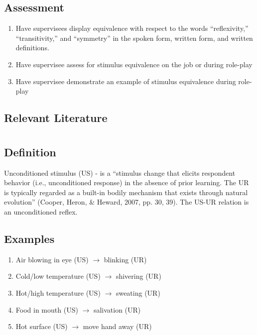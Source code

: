 \subsection{Assessment}
\begin{enumerate}
\item Have supervisees display equivalence with respect to the words ``reflexivity,'' ``transitivity,'' and ``symmetry'' in the spoken form, written form, and written definitions.
\item Have supervisee assess for stimulus equivalence on the job or during role-play 
\item Have supervisee demonstrate an example of stimulus equivalence during role-play
%
\end{enumerate}
%
\subsection{Relevant Literature}
\begin{refsection}
\nocite{test,alang2017police,clayton2018black}
\printbibliography[heading=none]
\end{refsection}
%
%
%
%
%
%
%
\section{\fourFKThirteen{}}
\subsection{Definition} 
Unconditioned stimulus (US) - is a ``stimulus change that elicits respondent behavior (i.e., unconditioned response) in the absence of prior learning.  The UR is typically regarded as a built-in bodily mechanism that exists through natural evolution'' (Cooper, Heron, \& Heward, 2007, pp. 30, 39).   The US-UR relation is an unconditioned reflex.
%
\subsection{Examples}
\begin{enumerate}
\item Air blowing in eye (US) $\rightarrow$ blinking (UR)
\item Cold/low temperature (US) $\rightarrow$ shivering (UR)
\item Hot/high temperature (US) $\rightarrow$ sweating (UR)
\item Food in mouth (US) $\rightarrow$ salivation (UR)
\item Hot surface (US) $\rightarrow$ move hand away (UR)
%
\end{enumerate}
%

